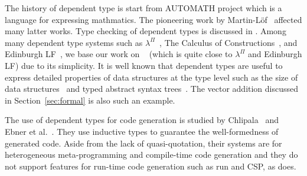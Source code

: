 The history of dependent type is start from AUTOMATH
project\cite{DeBruijnNicolaas1970AUTOMATH} which is a language for expressing
mathmatics. The pioneering work by
Martin-L\"{o}f~\cite{MartinLof1973Intuitionistic} affected many latter works.
Type checking of dependent types is discussed in
\cite{Cardelli1988Typechecking, Coquand1996Typechecking}.  Among many dependent
type systems such as $\lambda^\Pi$~\cite{MeyerReinhold1986Type}, The Calculus
of Constructions~\cite{Coquand1988CoC}, and Edinburgh
LF~\cite{HarperHonsellPlotkin1993Framework}, we base our work on
\LLF~\cite{benjamin2005attapldependent} (which is quite close to $\lambda^\Pi$ and Edinburgh LF) due
to its simplicity.  It is well known that dependent types are useful to express
detailed properties of data structures at the type level such as the size of
data structures~\cite{XiPfenning1998Eliminating} and typed abstract syntax
trees~\cite{LeijenMeijer1999DSEC, XiChenChen2003Guarded}. The vector addition
discussed in Section~\ref{sec:formal} is also such an example.






The use of dependent types for code generation is studied by
Chlipala~\cite{Chlipala2010Ur} and Ebner et
al.~\cite{EbnerUllrichRoeschAvigadMoura2017meta}. They use inductive types to
guarantee the well-formedness of generated code.  Aside from the lack of
quasi-quotation, their systems are for heterogeneous meta-programming and
compile-time code generation and they do not support features for run-time code
generation such as run and CSP, as \LMD{} does.

